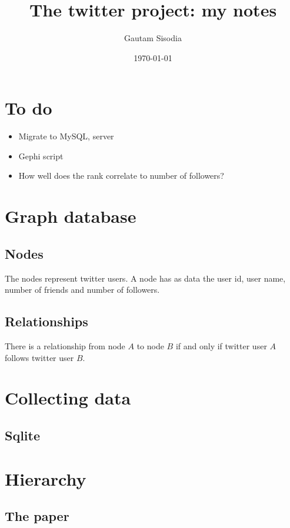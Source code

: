 \documentclass[11pt]{amsart}
\begin{document}
\title[]{The twitter project: my notes}
\date{\today}
\author{Gautam Sisodia} 
\maketitle

\section{To do}

\begin{itemize}
\item Migrate to MySQL, server
\item Gephi script
\item How well does the rank correlate to number of followers?
\end{itemize}


\section{Graph database}

\subsection{Nodes}

The nodes represent twitter users. A node has as data the user id, user name, number of friends and number of followers.

\subsection{Relationships}

There is a relationship from node $A$ to node $B$ if and only if twitter user $A$ follows twitter user $B$. 


\section{Collecting data}

\subsection{Sqlite}


\section{Hierarchy}


\subsection{The paper \cite{hier1}}
\end{document}
